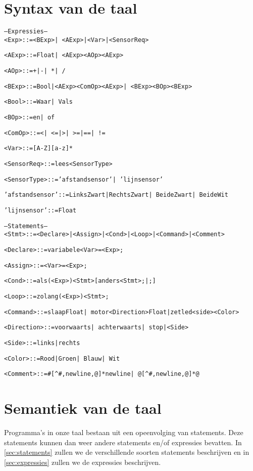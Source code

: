 \documentclass[12pt, titlepage]{article}
\begin{document}
\section{Syntax van de taal}
\label{sec:syntax_van_de_taal}
\begin{alltt}
-- Expressies --
<Exp>           ::= <BExp> | <AExp> | <Var> | <SensorReq>

<AExp>          ::= Float | <AExp> <AOp> <AExp>

<AOp>           ::= + | - | * | /

<BExp>          ::= Bool | <AExp> <ComOp> <AExp> | <BExp> <BOp> <BExp>

<Bool>          ::= Waar | Vals

<BOp>           ::= en | of

<ComOp>         ::= < | <= | > | >= | == | !=

<Var>           ::= [A-Z][a-z]*

<SensorReq>     ::= lees <SensorType>

<SensorType>    ::= 'afstandsensor' | 'lijnsensor'

'afstandsensor' ::= LinksZwart | RechtsZwart | BeideZwart | BeideWit

'lijnsensor'    ::= Float

-- Statements --
<Stmt>          ::= <Declare> | <Assign> | <Cond> | <Loop> | <Command> | <Comment>

<Declare>       ::= variabele <Var> = <Exp>;

<Assign>        ::= <Var> = <Exp>;

<Cond>          ::= als ( <Exp> ) { <Stmt> } [anders { <Stmt> }; | ;]

<Loop>          ::= zolang ( <Exp> ) { <Stmt> };

<Command>       ::= slaap Float | motor <Direction> Float | zetled <side> <Color>

<Direction>     ::= voorwaarts | achterwaarts | stop | <Side>

<Side>          ::= links | rechts

<Color>         ::= Rood | Groen | Blauw | Wit

<Comment>       ::= # [^#,newline,@]* newline | @ [^#,newline,@]* @

\end{alltt}

\section{Semantiek van de taal}
\label{sec:semantiek_van_de_taal}
Programma's in onze taal bestaan uit een opeenvolging van statements. Deze statements kunnen dan weer andere statements en/of expressies bevatten. In \ref{sec:statements} zullen we de verschillende soorten statements beschrijven en in \ref{sec:expressies} zullen we de expressies beschrijven.
\end{document}
